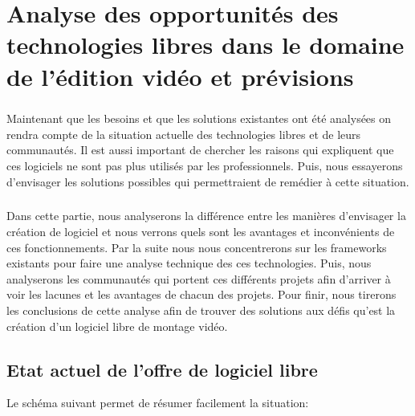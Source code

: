 \chapter{Analyse des opportunités des technologies libres dans le
domaine de l'édition vidéo et prévisions}

\minitoc \newpage

\paragraph{}

Maintenant que les besoins et que les solutions existantes ont été
analysées on rendra compte de la situation actuelle des technologies
libres et de leurs communautés. Il est aussi important de chercher
les raisons qui expliquent que ces logiciels ne sont pas plus utilisés
par les professionnels. Puis, nous essayerons d'envisager les solutions
possibles qui permettraient de remédier à cette situation.

\paragraph{}

Dans cette partie, nous analyserons la différence entre les manières
d'envisager la création de logiciel et nous verrons quels sont les
avantages et inconvénients de ces fonctionnements. Par la suite nous
nous concentrerons sur les frameworks existants pour faire une analyse
technique des ces technologies. Puis, nous analyserons les communautés
qui portent ces différents projets afin d'arriver à voir les lacunes
et les avantages de chacun des projets.  Pour finir, nous tirerons les
conclusions de cette analyse afin de trouver des solutions aux défis
qu'est la création d'un logiciel libre de montage vidéo.

\newpage

\section {Etat actuel de l'offre de logiciel libre}

Le schéma suivant permet de résumer facilement la situation:

